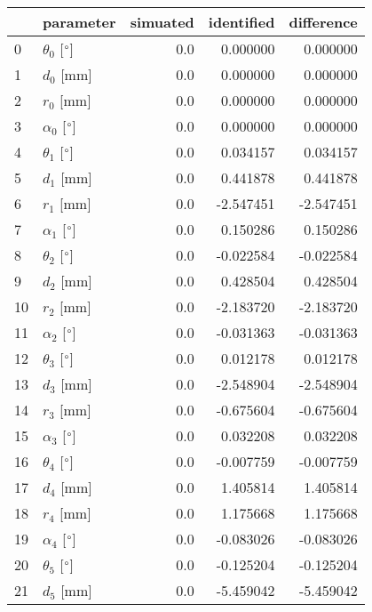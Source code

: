 \documentclass{standalone}%
\begin{document}
%
\normalsize%
\begin{tabular}{llrrr}
\toprule
{} &                 parameter & simuated & identified & difference \\
\midrule
0  &  $\theta_{0}$ [$\degree$] &      0.0 &   0.000000 &   0.000000 \\
1  &              $d_{0}$ [mm] &      0.0 &   0.000000 &   0.000000 \\
2  &              $r_{0}$ [mm] &      0.0 &   0.000000 &   0.000000 \\
3  &  $\alpha_{0}$ [$\degree$] &      0.0 &   0.000000 &   0.000000 \\
4  &  $\theta_{1}$ [$\degree$] &      0.0 &   0.034157 &   0.034157 \\
5  &              $d_{1}$ [mm] &      0.0 &   0.441878 &   0.441878 \\
6  &              $r_{1}$ [mm] &      0.0 &  -2.547451 &  -2.547451 \\
7  &  $\alpha_{1}$ [$\degree$] &      0.0 &   0.150286 &   0.150286 \\
8  &  $\theta_{2}$ [$\degree$] &      0.0 &  -0.022584 &  -0.022584 \\
9  &              $d_{2}$ [mm] &      0.0 &   0.428504 &   0.428504 \\
10 &              $r_{2}$ [mm] &      0.0 &  -2.183720 &  -2.183720 \\
11 &  $\alpha_{2}$ [$\degree$] &      0.0 &  -0.031363 &  -0.031363 \\
12 &  $\theta_{3}$ [$\degree$] &      0.0 &   0.012178 &   0.012178 \\
13 &              $d_{3}$ [mm] &      0.0 &  -2.548904 &  -2.548904 \\
14 &              $r_{3}$ [mm] &      0.0 &  -0.675604 &  -0.675604 \\
15 &  $\alpha_{3}$ [$\degree$] &      0.0 &   0.032208 &   0.032208 \\
16 &  $\theta_{4}$ [$\degree$] &      0.0 &  -0.007759 &  -0.007759 \\
17 &              $d_{4}$ [mm] &      0.0 &   1.405814 &   1.405814 \\
18 &              $r_{4}$ [mm] &      0.0 &   1.175668 &   1.175668 \\
19 &  $\alpha_{4}$ [$\degree$] &      0.0 &  -0.083026 &  -0.083026 \\
20 &  $\theta_{5}$ [$\degree$] &      0.0 &  -0.125204 &  -0.125204 \\
21 &              $d_{5}$ [mm] &      0.0 &  -5.459042 &  -5.459042 \\

\end{tabular}
\end{document}
